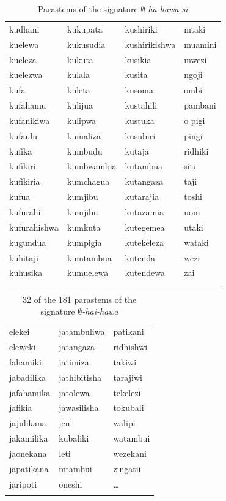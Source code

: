 \documentclass[output=paper,colorlinks,citecolor=brown]{langscibook}
\begin{document}
\begin{table}
\begin{tabular}{llll}
kudhani &      kukupata &    kushiriki &     mtaki \\ 
kuelewa &      kukusudia &   kushirikishwa & muamini \\  
kueleza &      kukuta &      kusikia &       mwezi \\ 
kuelezwa &     kulala &      kusita &        ngoji \\ 
kufa &         kuleta &      kusoma &        ombi \\ 
kufahamu &     kulijua &     kustahili &     pambani \\ 
kufanikiwa &   kulipwa &     kustuka & o     pigi \\ 
kufaulu &      kumaliza &    kusubiri &      pingi \\ 
kufika &       kumbudu &     kutaja &        ridhiki \\ 
kufikiri &     kumbwambia &  kutambua &      siti \\ 
kufikiria &    kumchagua &   kutangaza &     taji \\ 
kufua &        kumjibu &     kutarajia &     toshi \\ 
kufurahi &     kumjibu &     kutazamia &     uoni \\ 
kufurahishwa & kumkuta &     kutegemea &     utaki \\ 
kugundua &     kumpigia &    kutekeleza &    wataki \\ 
kuhitaji &     kumtambua &   kutenda &       wezi \\ 
kuhusika &     kumuelewa &   kutendewa &     zai \\ 
\lspbottomrule
\end{tabular}
\caption{Parastems of the signature \textit{$\emptyset$-ha-hawa-si}\label{negation2}}
\end{table}






\begin{table}
\begin{tabular}{lll}
\lsptoprule
elekei &      jatambuliwa &   patikani \\ 
eleweki &     jatangaza &     ridhishwi \\
fahamiki &    jatimiza &      takiwi \\ 
jabadilika &  jathibitisha &  tarajiwi \\ 
jafahamika &  jatolewa &      tekelezi \\ 
jafikia &     jawasilisha &   tokubali \\ 
jajulikana &  jeni &          walipi \\ 
jakamilika &  kubaliki &      watambui \\ 
jaonekana &   leti &          wezekani \\ 
japatikana &  mtambui &       zingatii \\ 
jaripoti &    oneshi & \ldots \\\lspbottomrule
\end{tabular}
\caption{32 of the 181 parastems of the signature \textit{$\emptyset$-hai-hawa}}
\label{negation3}
\end{table}
\end{document}
